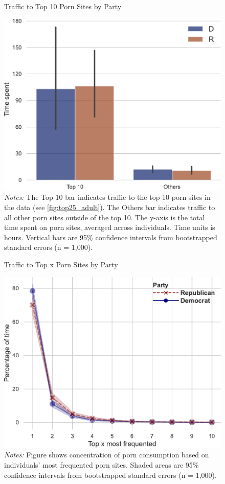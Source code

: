 \documentclass[12pt, letterpaper]{article}
\begin{document}
\begin{figure}
	\centering
	\caption{Traffic to Top 10 Porn Sites by Party}
	\includegraphics[width=.6\textwidth]{../figs/concentration_porn_consumption_by_party.pdf}
	\caption*{\footnotesize \emph{Notes:} 
		The Top 10 bar indicates traffic to the top 10 porn sites in the data (see \cref{fig:top25_adult}).
		The Others bar indicates traffic to all other porn sites outside of the top 10.
		The y-axis is the total time spent on porn sites, averaged across individuals.
		Time units is hours.
		Vertical bars are 95\% confidence intervals from bootstrapped standard errors (n = 1,000).
	}
	\label{fig:concentration_porn_consumption_by_party}
\end{figure}

\begin{figure}
	\centering
	\caption{Traffic to Top x Porn Sites by Party}
	\includegraphics[width=.6\textwidth]{../figs/concentration_porn_consumption_topX_by_party.pdf}
	\caption*{\footnotesize \emph{Notes:} 
		Figure shows concentration of porn consumption based on individuals' most frequented porn sites.
		Shaded areas are 95\% confidence intervals from bootstrapped standard errors (n = 1,000).
	}
	\label{fig:concentration_porn_consumption_topX_by_party}
\end{figure}
\end{document}
